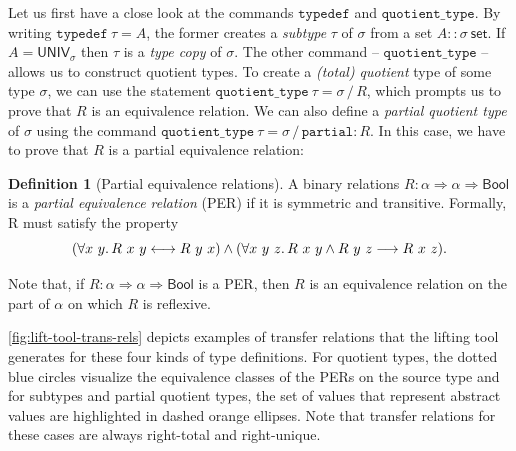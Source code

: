 \documentclass{article}
\theoremstyle{definition}
\newtheorem{definition}{Definition}[section]
\newcommand{\bool}{\mathsf{Bool}}
\begin{document}
Let us first have a close look at the commands \(\mathtt{typedef}\) and \(\mathtt{quotient\_type}\).
By writing \(	\mathtt{typedef}\ \tau = A\),
the former creates a \emph{subtype} \(\tau\) of $\sigma$ from a set \(A :: \sigma\ \mathsf{set}\).
If \(A = \mathsf{UNIV_\sigma}\)
then \(\tau\) is a \emph{type copy} of \(\sigma\).
The other command -- \(\mathtt{quotient\_type}\) -- allows us to construct quotient types.
To create a \emph{(total) quotient} type of some type \(\sigma\),
we can use the statement \(\mathtt{quotient\_type}\ \tau = \sigma\, /\, R\),
which prompts us to prove that \(R\) is an equivalence relation.
We can also define a \emph{partial quotient type} of \(\sigma\) using the command \(\mathtt{quotient\_type}\ \tau = \sigma\, /\, \mathtt{partial} : R\).
In this case,
we have to prove that \(R\) is a partial equivalence relation:
\begin{definition}[Partial equivalence relations]
  A binary relations \(R : \alpha \Rightarrow \alpha \Rightarrow \bool\) is a \emph{partial equivalence relation} (PER) if it is symmetric and transitive. Formally, R must satisfy the property
	\begin{equation}
		(\forall x\ y\ldotp R\ x\ y \longleftrightarrow R\ y\ x) \land (\forall x\ y\ z\ldotp R\ x\ y \land R\ y\ z \longrightarrow R\ x\ z).
	\end{equation}
\end{definition}
Note that, if \(R : \alpha \Rightarrow \alpha \Rightarrow \bool\) is a PER, then \(R\) is an equivalence relation on the part of \(\alpha\) on which \(R\) is reflexive.

\cref{fig:lift-tool-trans-rels} depicts examples of transfer relations that the lifting tool generates for these four kinds of type definitions.
For quotient types, the dotted blue circles visualize the equivalence classes of the PERs on the source type
and for subtypes and partial quotient types, the set of values that represent abstract values are highlighted in dashed orange ellipses.
Note that transfer relations for these cases are always right-total and right-unique.
\end{document}
